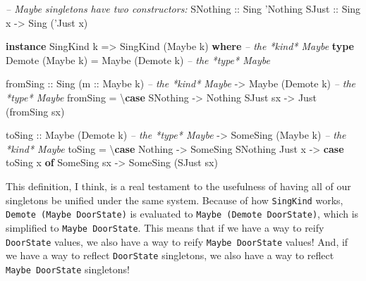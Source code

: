\documentclass[]{article}
\newenvironment{Shaded}{}{}
\newcommand{\CommentTok}[1]{\textcolor[rgb]{0.38,0.63,0.69}{\textit{#1}}}
\newcommand{\DataTypeTok}[1]{\textcolor[rgb]{0.56,0.13,0.00}{#1}}
\newcommand{\KeywordTok}[1]{\textcolor[rgb]{0.00,0.44,0.13}{\textbf{#1}}}
\newcommand{\NormalTok}[1]{#1}
\newcommand{\OtherTok}[1]{\textcolor[rgb]{0.00,0.44,0.13}{#1}}
\begin{document}
\begin{Shaded}
\begin{Highlighting}[]
\CommentTok{-- Maybe singletons have two constructors:}
\DataTypeTok{SNothing}\OtherTok{ ::} \DataTypeTok{Sing} \DataTypeTok{'Nothing}
\DataTypeTok{SJust}\OtherTok{    ::} \DataTypeTok{Sing}\NormalTok{ x }\OtherTok{->} \DataTypeTok{Sing}\NormalTok{ (}\DataTypeTok{'Just}\NormalTok{ x)}

\KeywordTok{instance} \DataTypeTok{SingKind}\NormalTok{ k }\OtherTok{=>} \DataTypeTok{SingKind}\NormalTok{ (}\DataTypeTok{Maybe}\NormalTok{ k) }\KeywordTok{where}     \CommentTok{-- the *kind* Maybe}
    \KeywordTok{type} \DataTypeTok{Demote}\NormalTok{ (}\DataTypeTok{Maybe}\NormalTok{ k) }\OtherTok{=} \DataTypeTok{Maybe}\NormalTok{ (}\DataTypeTok{Demote}\NormalTok{ k)        }\CommentTok{-- the *type* Maybe}

\NormalTok{    fromSing}
\OtherTok{        ::} \DataTypeTok{Sing}\NormalTok{ (}\OtherTok{m ::} \DataTypeTok{Maybe}\NormalTok{ k)        }\CommentTok{-- the *kind* Maybe}
        \OtherTok{->} \DataTypeTok{Maybe}\NormalTok{ (}\DataTypeTok{Demote}\NormalTok{ k)           }\CommentTok{-- the *type* Maybe}
\NormalTok{    fromSing }\OtherTok{=}\NormalTok{ \textbackslash{}}\KeywordTok{case}
        \DataTypeTok{SNothing} \OtherTok{->} \DataTypeTok{Nothing}
        \DataTypeTok{SJust}\NormalTok{ sx }\OtherTok{->} \DataTypeTok{Just}\NormalTok{ (fromSing sx)}

\NormalTok{    toSing}
\OtherTok{        ::} \DataTypeTok{Maybe}\NormalTok{ (}\DataTypeTok{Demote}\NormalTok{ k)             }\CommentTok{-- the *type* Maybe}
        \OtherTok{->} \DataTypeTok{SomeSing}\NormalTok{ (}\DataTypeTok{Maybe}\NormalTok{ k)           }\CommentTok{-- the *kind* Maybe}
\NormalTok{    toSing }\OtherTok{=}\NormalTok{ \textbackslash{}}\KeywordTok{case}
        \DataTypeTok{Nothing} \OtherTok{->} \DataTypeTok{SomeSing} \DataTypeTok{SNothing}
        \DataTypeTok{Just}\NormalTok{ x  }\OtherTok{->} \KeywordTok{case}\NormalTok{ toSing x }\KeywordTok{of}
          \DataTypeTok{SomeSing}\NormalTok{ sx }\OtherTok{->} \DataTypeTok{SomeSing}\NormalTok{ (}\DataTypeTok{SJust}\NormalTok{ sx)}
\end{Highlighting}
\end{Shaded}

This definition, I think, is a real testament to the usefulness of having all of
our singletons be unified under the same system. Because of how
\texttt{SingKind} works, \texttt{Demote\ (Maybe\ DoorState)} is evaluated to
\texttt{Maybe\ (Demote\ DoorState)}, which is simplified to
\texttt{Maybe\ DoorState}. This means that if we have a way to reify
\texttt{DoorState} values, we also have a way to reify \texttt{Maybe\ DoorState}
values! And, if we have a way to reflect \texttt{DoorState} singletons, we also
have a way to reflect \texttt{Maybe\ DoorState} singletons!
\end{document}
